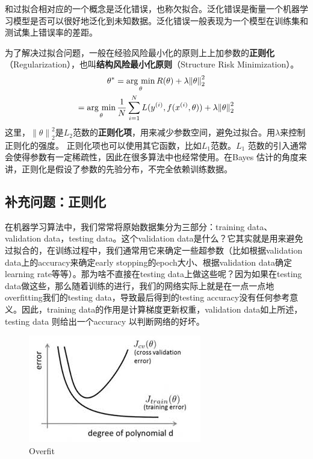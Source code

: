 \documentclass[11pt,fleqn, UTF8]{ctexbook} %
\newcommand{\argmin}{\mathop{\rm arg~min}\limits}
\begin{document}
和过拟合相对应的一个概念是泛化错误，也称欠拟合。泛化错误是衡量一个机器学习模型是否可以很好地泛化到未知数据。泛化错误一般表现为一个模型在训练集和测试集上错误率的差距。

为了解决过拟合问题，一般在经验风险最小化的原则上上加参数的\textbf{正则化}（Regularization），也叫\textbf{结构风险最小化原则}（Structure Risk Minimization）。
\begin{gather}\label{3.5}
  \theta^{*}=\argmin_{\theta}R(\theta)+\lambda {\| \theta \|}_2^2\\
  =\argmin_{\theta}\frac{1}{N}\sum_{i=1}^{N}L(y^{(i)},f(x^{(i)}, \theta)) +\lambda {\| \theta \|}_2^2
\end{gather}
这里，${\| \theta \|}_2^2$是$L_2$范数的\textbf{正则化项}，用来减少参数空间，避免过拟合。用$\lambda$来控制正则化的强度。
正则化项也可以使用其它函数，比如$L_1$范数。$L_1$ 范数的引入通常会使得参数有一定稀疏性，因此在很多算法中也经常使用。在Bayes 估计的角度来讲，正则化是假设了参数的先验分布，不完全依赖训练数据。
\subsection{补充问题：正则化}
在机器学习算法中，我们常常将原始数据集分为三部分：training data、validation data，testing data。这个validation data是什么？它其实就是用来避免过拟合的，在训练过程中，我们通常用它来确定一些超参数（比如根据validation data上的accuracy来确定early stopping的epoch大小、根据validation data确定learning rate等等）。那为啥不直接在testing data上做这些呢？因为如果在testing data做这些，那么随着训练的进行，我们的网络实际上就是在一点一点地overfitting我们的testing data，导致最后得到的testing accuracy没有任何参考意义。因此，training data的作用是计算梯度更新权重，validation data如上所述，testing data 则给出一个accuracy 以判断网络的好坏。

\begin{figure}[t]
 \centering
 \includegraphics{pics/Regu1.jpg}
 \caption{Overfit}
 \label{fig:Regu1}
\end{figure}
\end{document}
